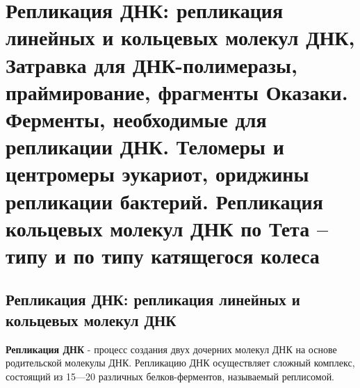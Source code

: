 \section{Репликация ДНК: репликация линейных и кольцевых молекул ДНК, Затравка для ДНК-полимеразы, праймирование, фрагменты Оказаки. Ферменты, необходимые для репликации
ДНК. Теломеры и центромеры эукариот, ориджины репликации бактерий. Репликация кольцевых молекул ДНК по Тета –типу и по типу катящегося колеса}
\subsection{Репликация ДНК: репликация линейных и кольцевых молекул ДНК}
\textbf{Репликация ДНК} - процесс создания двух дочерних молекул ДНК на основе родительской молекулы ДНК. Репликацию ДНК осуществляет сложный комплекс, состоящий из 15—20 различных белков-ферментов, называемый реплисомой.

